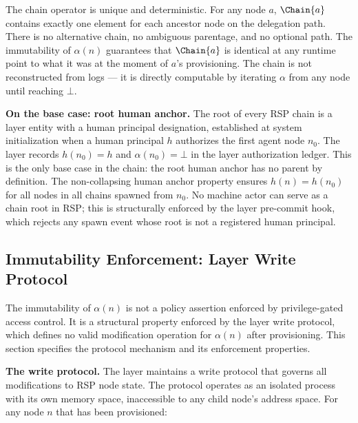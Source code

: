 The chain operator is unique and deterministic. For any node $a$, $\Chain{a}$ contains exactly one element for each ancestor node on the delegation path. There is no alternative chain, no ambiguous parentage, and no optional path. The immutability of $\alpha(n)$ guarantees that $\Chain{a}$ is identical at any runtime point to what it was at the moment of $a$'s provisioning. The chain is not reconstructed from logs --- it is directly computable by iterating $\alpha$ from any node until reaching $\bot$.

\begin{note}
\textbf{On the base case: root human anchor.}
The root of every RSP chain is a \purpose{} layer entity with a human principal designation, established at system initialization when a human principal $h$ authorizes the first agent node $n_0$. The \purpose{} layer records $h(n_0) = h$ and $\alpha(n_0) = \bot$ in the \fact{} layer authorization ledger. This is the only base case in the chain: the root human anchor has no parent by definition. The non-collapsing human anchor property ensures $h(n) = h(n_0)$ for all nodes in all chains spawned from $n_0$. No machine actor can serve as a chain root in RSP; this is structurally enforced by the \fact{} layer pre-commit hook, which rejects any spawn event whose root is not a registered human principal.
\end{note}

\subsection{Immutability Enforcement: \fact{} Layer Write Protocol}
\label{sec:fact-layer-write-protocol}

The immutability of $\alpha(n)$ is not a policy assertion enforced by privilege-gated access control. It is a structural property enforced by the \fact{} layer write protocol, which defines no valid modification operation for $\alpha(n)$ after provisioning. This section specifies the protocol mechanism and its enforcement properties.

\medskip
\noindent\textbf{The write protocol.} The \fact{} layer maintains a write protocol that governs all modifications to RSP node state. The protocol operates as an isolated process with its own memory space, inaccessible to any child node's address space. For any node $n$ that has been provisioned:

